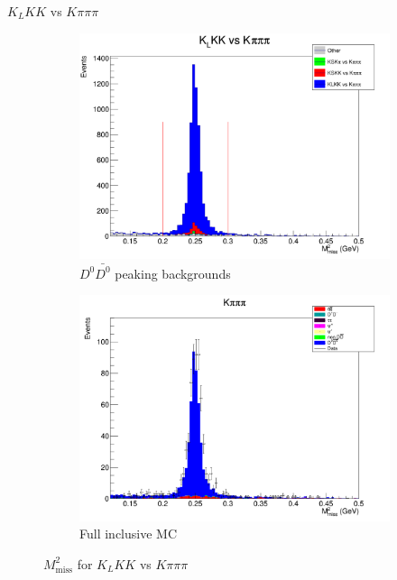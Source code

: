 \documentclass{beamer}
\begin{document}
\begin{frame}{$K_LKK$ vs $K\pi\pi\pi$}
  \begin{figure}
    \centering
    \begin{subfigure}{0.5\textwidth}
      \centering
      \includegraphics[width=\textwidth]{KLKKVersusKpipipiPeaking.png}
      \caption{$D^0\bar{D^0}$ peaking backgrounds}
    \end{subfigure}%
    \begin{subfigure}{0.5\textwidth}
      \centering
      \includegraphics[width=\textwidth]{KLKKVersusKpipipiDataInclusiveMC.png}
      \caption{Full inclusive MC}
    \end{subfigure}
    \caption{$M^2_\text{miss}$ for $K_LKK$ vs $K\pi\pi\pi$}
  \end{figure}
\end{frame}
\end{document}
